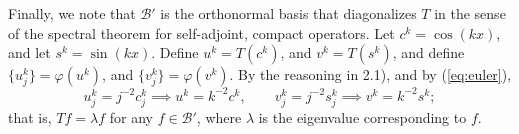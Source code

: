 \documentclass{homework}
\begin{document}
\begin{arabicparts}
		Finally, we note that $\mathcal{B}'$ is the orthonormal basis that diagonalizes $T$ in the sense of the spectral theorem for self-adjoint, compact operators. Let $c^k = \cos(kx)$, and let $s^k = \sin(kx)$. Define $u^k = T(c^k)$, and $v^k = T(s^k)$, and define $\{u^k_j\} = \varphi(u^k)$, and $\{v^k_j\} = \varphi(v^k)$. By the reasoning in 2.1), and by (\ref{eq:euler}),
		\begin{equation}
			u^k_j = j^{-2}c^k_j \implies u^k = k^{-2}c^k, \qquad v^k_j = j^{-2}s^k_j \implies v^k = k^{-2}s^k;
		\end{equation}
		that is, $Tf = \lambda f$ for any $f \in \mathcal{B}'$, where $\lambda$ is the eigenvalue corresponding to $f$.
	\end{arabicparts}
\end{document}

